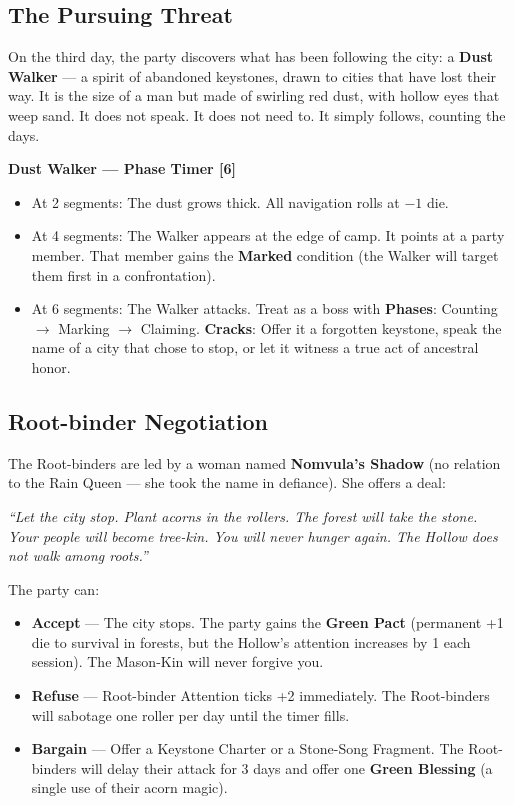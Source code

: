 \begin{tcolorbox}[colback=black!3,colframe=green!60!black,title={The Nine Rollers: A City on the Edge},breakable]
  \vspace{2mm}
  \subsection*{The Pursuing Threat}
  
  On the third day, the party discovers what has been following the city: a \textbf{Dust Walker} --- a spirit of abandoned keystones, drawn to cities that have lost their way. It is the size of a man but made of swirling red dust, with hollow eyes that weep sand. It does not speak. It does not need to. It simply follows, counting the days.
  
  \vspace{2mm}
  \textbf{Dust Walker --- Phase Timer [6]}
  \begin{itemize}
  \item At 2 segments: The dust grows thick. All navigation rolls at $-1$ die.
  \item At 4 segments: The Walker appears at the edge of camp. It points at a party member. That member gains the \textbf{Marked} condition (the Walker will target them first in a confrontation).
  \item At 6 segments: The Walker attacks. Treat as a boss with \textbf{Phases}: Counting $\rightarrow$ Marking $\rightarrow$ Claiming. \textbf{Cracks}: Offer it a forgotten keystone, speak the name of a city that chose to stop, or let it witness a true act of ancestral honor.
  \end{itemize}
  
  \vspace{2mm}
  \subsection*{Root-binder Negotiation}
  
  The Root-binders are led by a woman named \textbf{Nomvula's Shadow} (no relation to the Rain Queen --- she took the name in defiance). She offers a deal:
  
  \textit{``Let the city stop. Plant acorns in the rollers. The forest will take the stone. Your people will become tree-kin. You will never hunger again. The Hollow does not walk among roots.''}
  
  The party can:
  \begin{itemize}
  \item \textbf{Accept} --- The city stops. The party gains the \textbf{Green Pact} (permanent +1 die to survival in forests, but the Hollow's attention increases by 1 each session). The Mason-Kin will never forgive you.
  \item \textbf{Refuse} --- Root-binder Attention ticks +2 immediately. The Root-binders will sabotage one roller per day until the timer fills.
  \item \textbf{Bargain} --- Offer a Keystone Charter or a Stone-Song Fragment. The Root-binders will delay their attack for 3 days and offer one \textbf{Green Blessing} (a single use of their acorn magic).
  \end{itemize}
  

\end{tcolorbox}
